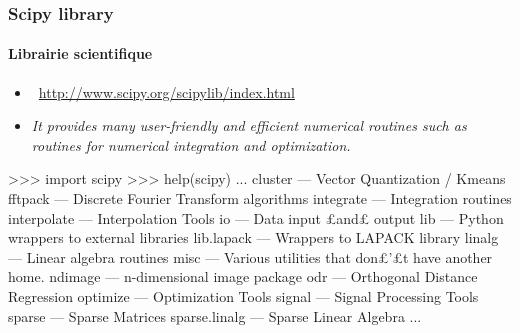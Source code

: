 \begin{frame}[fragile]
\frametitle{Scipy library}
\framesubtitle{Librairie scientifique}
\begin{itemize}
 \item {} \, \url{http://www.scipy.org/scipylib/index.html}
 \item \emph{It provides many user-friendly and efficient numerical routines such as routines for numerical integration and optimization.}
\end{itemize}
\begin{pythonConsole}
>>> import scipy
>>> help(scipy)
	...
     cluster                      --- Vector Quantization / Kmeans
     fftpack                      --- Discrete Fourier Transform algorithms
     integrate                    --- Integration routines
     interpolate                  --- Interpolation Tools
     io                           --- Data input £and£ output
     lib                          --- Python wrappers to external libraries
     lib.lapack                   --- Wrappers to LAPACK library
     linalg                       --- Linear algebra routines
     misc                         --- Various utilities that don£'£t have
                                      another home.
     ndimage                      --- n-dimensional image package
     odr                          --- Orthogonal Distance Regression
     optimize                     --- Optimization Tools
     signal                       --- Signal Processing Tools
     sparse                       --- Sparse Matrices
     sparse.linalg                --- Sparse Linear Algebra
    ...
\end{pythonConsole}
\end{frame}
